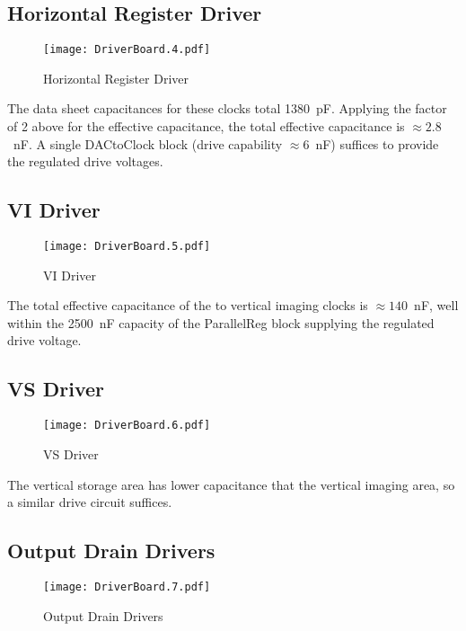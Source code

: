 \documentclass[a4paper,12pt]{article}
\begin{document}
\subsection{Horizontal Register Driver}
   \begin{figure}
   \begin{center}
   \texttt{[image: DriverBoard.4.pdf]}
   \end{center}
   \caption{Horizontal Register Driver}
   \end{figure}
   
The data sheet capacitances for these clocks total 1380\ pF. Applying the factor of 2 above for the effective capacitance, the total effective capacitance is $\approx 2.8$\ nF. A single DACtoClock block (drive capability $\approx 6$\ nF) suffices to provide the regulated drive voltages.
  

\subsection{VI Driver}
   \begin{figure}
   \begin{center}
   \texttt{[image: DriverBoard.5.pdf]}
   \end{center}
   \caption{VI Driver}
   \end{figure}

The total effective capacitance of the to vertical imaging clocks is $\approx 140$\ nF, well within the 2500\ nF capacity of the ParallelReg block supplying the regulated drive voltage.

\subsection{VS Driver}
   \begin{figure}
   \begin{center}
   \texttt{[image: DriverBoard.6.pdf]}
   \end{center}
   \caption{VS Driver}
   \end{figure}

The vertical storage area has lower capacitance that the vertical imaging area, so a similar drive circuit suffices.

\subsection{Output Drain Drivers}
   \begin{figure}
   \begin{center}
   \texttt{[image: DriverBoard.7.pdf]}
   \end{center}
   \caption{Output Drain Drivers}
   \end{figure}
\end{document}
